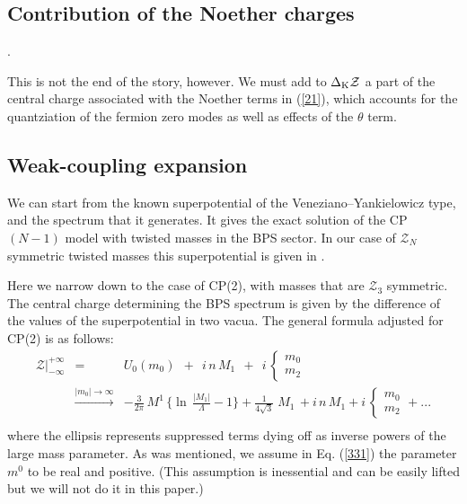 \documentclass[epsfig,12pt]{article}
\newcommand{\mc}[1]{\mathcal{#1}}
\begin{document}
\subsection{Contribution of the Noether charges}.

This is not the end of the story, however. We must add to $\Delta_{\rm K}{\mathcal Z}$
a part of the central charge associated with the Noether terms in (\ref{21}), which accounts for the quantziation of the
fermion zero modes as well as effects of the $\theta$ term.


\subsection{Weak-coupling expansion}

       We can start from the known superpotential of the Veneziano--Yankielowicz type, and the spectrum that it generates.
       It gives the  exact solution of the CP$(N-1)$ model with twisted masses in the BPS sector. 
       In our case of $\mc{Z}_N$ symmetric twisted masses this superpotential is given in \cite{Bolokhov:2011mp}.
       
       Here we narrow down to the case of CP(2), with masses that are $ \mc{Z}_3 $ symmetric.
The central charge determining the BPS spectrum is given by the difference of the values of the superpotential in  two vacua.
The general formula adjusted for CP(2) is  \cite{Bolokhov:2011mp} as follows:
\begin{eqnarray}
       \mc{Z}\Big|^{\scriptscriptstyle +\infty}_{\scriptscriptstyle -\infty} 
       &=&
       U_0(m_0)  ~~+~~ i\, n\, M_1 ~~+~~ i\, \left\{
       \begin{array}{ll}
       m_0\\[1mm]m_2
       \end{array}
       \right.
       \nonumber\\[3mm]
       &\stackrel{|m_0|\to\infty}{\longrightarrow}&
-
       \frac{3}{2\pi}\, M^1\, \Big\{ \ln\, \frac {   |M_1|   }
                                                 {  \Lambda  } -1 \Big\} +  \frac{1}{4\sqrt{3}}\; M_1\, +i\,n\, M_1
       +  i\,\left\{
       \begin{array}{ll}
       m_0\\[1mm]m_2
       \end{array}
       \right. +
       ...
        \nonumber\\[3mm]
       \label{331}
\end{eqnarray}
       where the ellipsis represents  suppressed terms dying off as inverse powers of the large mass parameter.
As was mentioned, we assume  in Eq. (\ref{331}) the parameter $ m^0 $ to be real 
and positive. (This assumption is inessential and can be easily lifted but we will not do it in this paper.)
\end{document}
